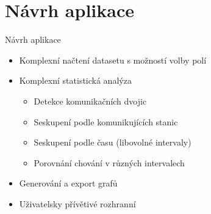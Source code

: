 \documentclass[hyperref={unicode}, xcolor={table}]{beamer}
\begin{document}
%         

            


\section{Návrh aplikace}

\begin{frame}{Návrh aplikace}
    
        \begin{itemize}
            \item Komplexní načtení datasetu s možností volby polí
            \item Komplexní statistická analýza
            \begin{itemize}
                \item Detekce komunikačních dvojic
                \item Seskupení podle komunikujících stanic
                \item Seskupení podle času (libovolné intervaly)
                \item Porovnání chování v různých intervalech
            \end{itemize}
            \item Generování a export grafů
            \item Uživatelsky přívětivé rozhranní
        \end{itemize}
    
\end{frame}

\section{}
\end{document}
